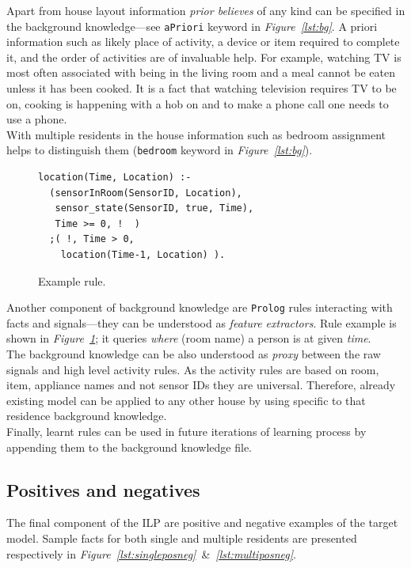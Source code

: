 \documentclass[10pt, a4paper, pdflatex, leqno, twoside, openright]{report}
\begin{document}
Apart from house layout information \emph{prior believes} of any kind can be specified in the background knowledge---see \texttt{aPriori} keyword in \emph{Figure~\ref{lst:bg}}. A priori information such as likely place of activity, a device or item required to complete it, and the order of activities are of invaluable help. For example, watching TV is most often associated with being in the living room and a meal cannot be eaten unless it has been cooked. It is a fact that watching television requires TV to be on, cooking is happening with a hob on and to make a phone call one needs to use a phone.\\
With multiple residents in the house information such as bedroom assignment helps to distinguish them (\texttt{bedroom} keyword in \emph{Figure~\ref{lst:bg}}).\\

\begin{figure}[htb] %
  \begin{verbatim}
location(Time, Location) :-
  (sensorInRoom(SensorID, Location),
   sensor_state(SensorID, true, Time),
   Time >= 0, !  )
  ;( !, Time > 0,
    location(Time-1, Location) ).
  \end{verbatim}
  \caption{Example rule.\label{lst:bg:rule}}
\end{figure}

Another component of background knowledge are \texttt{Prolog} rules interacting with facts and signals---they can be understood as \emph{feature extractors}. Rule example is shown in \emph{Figure~\ref{lst:bg:rule}}; it queries \emph{where} (room name) a person is at given \emph{time}.\\

The background knowledge can be also understood as \emph{proxy} between the raw signals and high level activity rules. As the activity rules are based on room, item, appliance names and not sensor IDs they are universal. Therefore, already existing model can be applied to any other house by using specific to that residence background knowledge.\\
Finally, learnt rules can be used in future iterations of learning process by appending them to the background knowledge file.


    \subsection{Positives and negatives\label{sec:data:posneg}}
The final component of the ILP are positive and negative examples of the target model. Sample facts for both single and multiple residents are presented respectively in \emph{Figure~\ref{lst:singleposneg}}~\&~\emph{\ref{lst:multiposneg}}.\\
\end{document}
